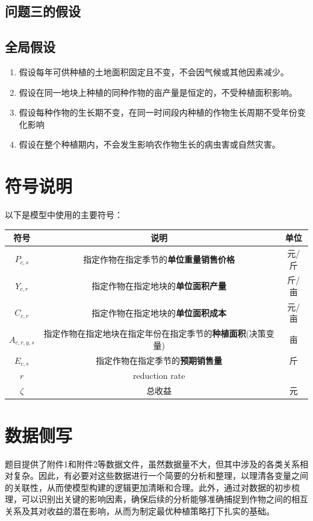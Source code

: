 \documentclass{cumcmthesis}
\begin{document}
\subsection{问题三的假设}
\subsection{全局假设}
\begin{enumerate}
    \item 假设每年可供种植的土地面积固定且不变，不会因气候或其他因素减少。
    \item 假设在同一地块上种植的同种作物的亩产量是恒定的，不受种植面积影响。
    \item 假设每种作物的生长期不变，在同一时间段内种植的作物生长周期不受年份变化影响
    \item 假设在整个种植期内，不会发生影响农作物生长的病虫害或自然灾害。
\end{enumerate}


\section{符号说明}
以下是模型中使用的主要符号：
\begin{table}[!htbp]
    \begin{tabular}{ccc}
        \toprule[1.5pt]
        符号 & 说明 & 单位\\
        \midrule[1pt]
        $P_{c,s}$ & 指定作物在指定季节的\textbf{单位重量销售价格} & 元/斤 \\
        $Y_{c,r}$ & 指定作物在指定地块的\textbf{单位面积产量} & 斤/亩\\
        $C_{c,r}$ & 指定作物在指定地块的\textbf{单位面积成本} & 元/亩\\
        $A_{c,r,y,s}$ & 指定作物在指定地块在指定年份在指定季节的\textbf{种植面积}(决策变量) & 亩\\
        $E_{c,s}$ & 指定作物在指定季节的\textbf{预期销售量} & 斤\\
        $r$ & reduction rate & \\
        
        $\zeta$ & 总收益 & 元\\
        \bottomrule[1.5pt]
    \end{tabular}
\end{table}

\section{数据侧写}
题目提供了附件1和附件2等数据文件，虽然数据量不大，但其中涉及的各类关系相对复杂。因此，有必要对这些数据进行一个简要的分析和整理，以理清各变量之间的关联性，从而使模型构建的逻辑更加清晰和合理。此外，通过对数据的初步梳理，可以识别出关键的影响因素，确保后续的分析能够准确捕捉到作物之间的相互关系及其对收益的潜在影响，从而为制定最优种植策略打下扎实的基础。
\end{document}
